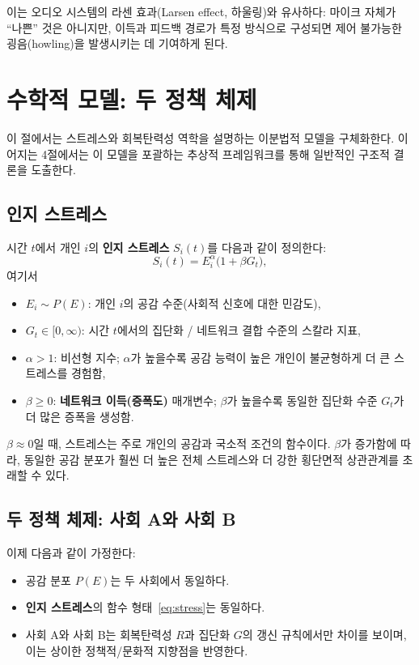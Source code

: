 \documentclass[11pt]{article}
\theoremstyle{plain}
\begin{document}
이는 오디오 시스템의 라센 효과(Larsen effect, 하울링)와 유사하다: 마이크 자체가 ``나쁜'' 것은 아니지만, 이득과 피드백 경로가 특정 방식으로 구성되면 제어 불가능한 굉음(howling)을 발생시키는 데 기여하게 된다.

\section{수학적 모델: 두 정책 체제}
\label{sec:model}

이 절에서는 스트레스와 회복탄력성 역학을 설명하는 이분법적 모델을 구체화한다.
이어지는 4절에서는 이 모델을 포괄하는 추상적 프레임워크를 통해 일반적인 구조적 결론을 도출한다.

\subsection{인지 스트레스}
시간 $t$에서 개인 $i$의 \textbf{인지 스트레스} $S_i(t)$를 다음과 같이 정의한다:
\begin{equation}
S_i(t) = E_i^{\alpha} \bigl( 1 + \beta G_t \bigr),
\label{eq:stress}
\end{equation}
여기서
\begin{itemize}
  \item $E_i \sim P(E)$: 개인 $i$의 공감 수준(사회적 신호에 대한 민감도),
  \item $G_t \in [0,\infty)$: 시간 $t$에서의 집단화 / 네트워크 결합 수준의 스칼라 지표,
  \item $\alpha > 1$: 비선형 지수; $\alpha$가 높을수록 공감 능력이 높은 개인이 불균형하게 더 큰 스트레스를 경험함,
  \item $\beta \ge 0$: \textbf{네트워크 이득(증폭도)} 매개변수; $\beta$가 높을수록 동일한 집단화 수준 $G_t$가 더 많은 증폭을 생성함.
\end{itemize}

$\beta \approx 0$일 때, 스트레스는 주로 개인의 공감과 국소적 조건의 함수이다.
$\beta$가 증가함에 따라, 동일한 공감 분포가 훨씬 더 높은 전체 스트레스와 더 강한 횡단면적 상관관계를 초래할 수 있다.

\subsection{두 정책 체제: 사회 A와 사회 B}

이제 다음과 같이 가정한다:
\begin{itemize}
  \item 공감 분포 $P(E)$는 두 사회에서 동일하다.
  \item \textbf{인지 스트레스}의 함수 형태~\eqref{eq:stress}는 동일하다.
  \item 사회 A와 사회 B는 회복탄력성 $R$과 집단화 $G$의 갱신 규칙에서만 차이를 보이며, 이는 상이한 정책적/문화적 지향점을 반영한다.
\end{itemize}
\end{document}
